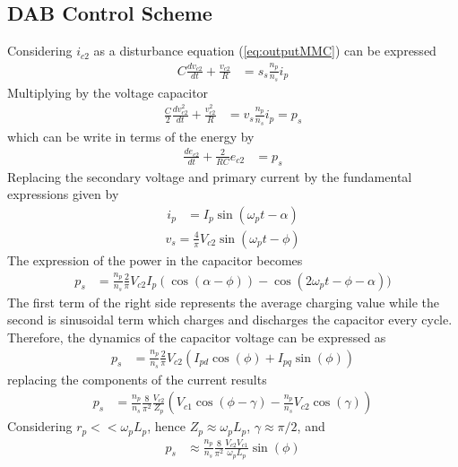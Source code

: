 \documentclass[conference]{IEEEtran}
\begin{document}
\subsection{DAB Control Scheme}
Considering $i_{c2}$ as a disturbance equation (\ref{eq:outputMMC}) can be expressed
\begin{align}
C\frac{dv_{c2}}{dt}+\frac{v_{c2}}{R}&=s_s\frac{n_p}{n_s}i_p
\end{align}
Multiplying by the voltage capacitor 
\begin{align}
\frac{C}{2}\frac{dv_{c2}^2}{dt}+\frac{v_{c2}^2}{R}&=v_s\frac{n_p}{n_s}i_p=p_s
\end{align}
which can be write in terms of the energy by
\begin{align}
\frac{de_{c2}}{dt}+\frac{2}{RC}e_{c2}&=p_s
\end{align}
Replacing the secondary voltage and primary current by the fundamental expressions given by
\begin{align}
i_p&=I_p\sin(\omega_p t-\alpha)
\end{align}
\begin{align}
v_s=\frac{4}{\pi}V_{c2}\sin(\omega_p t-\phi)
\end{align}
The expression of the power in the capacitor becomes
\begin{align}
p_s&=\frac{n_p}{n_s}\frac{2}{\pi}V_{c2}I_p(\cos(\alpha-\phi))-\cos(2\omega_p t-\phi-\alpha))
\end{align}
The first term of the right side represents the average charging value while the second  is sinusoidal term which charges and discharges the capacitor every cycle. Therefore, the dynamics of the capacitor voltage can be expressed as
\begin{align}
p_s&=\frac{n_p}{n_s}\frac{2}{\pi}V_{c2}(I_{pd}\cos(\phi)+I_{pq}\sin(\phi))
\end{align}
replacing the components of the current results
\begin{align}
p_s&=\frac{n_p}{n_s}\frac{8}{\pi^2}\frac{V_{c2}}{Z_p}\left( 
 V_{c1}\cos(\phi-\gamma)-\frac{n_p}{n_s}V_{c2}\cos(\gamma)
 \right)
\end{align}
Considering $r_p<<\omega_pL_p$, hence $Z_p\approx\omega_pL_p$, $\gamma\approx\pi/2$, and 
\begin{align}
p_s&\approx\frac{n_p}{n_s}\frac{8}{\pi^2}\frac{V_{c2} V_{c1}}{\omega_pL_p}
\sin(\phi)
\end{align}
\end{document}
